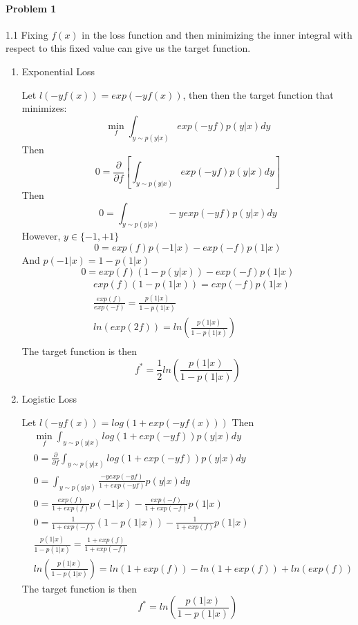 \documentclass[12pt]{report}
\begin{document}
\maketitle

\paragraph{Problem 1} 1.1
Fixing $f(x)$ in the loss function and then minimizing the inner integral with respect to this fixed value can give us the target function.
\begin{enumerate}
\item Exponential Loss
  
  Let $l(-yf(x)) = exp(-yf(x))$, then
  then the target function that minimizes:
  $$\min_{f}\int_{y \sim p(y | x)} exp(-yf) p(y|x)dy$$
  Then
  $$0 = \frac{\partial}{\partial f}\left[\int_{y \sim p(y|x)} exp(-yf)p(y|x)dy\right] $$
  Then
  $$0 = \int_{y \sim p(y|x)} -yexp(-yf)p(y|x)dy $$
  However, $y \in \{ -1, +1 \}$
  $$0 = exp(f)p(-1|x) - exp(-f)p(1|x) $$
  And $p(-1|x) = 1 - p(1|x)$
  $$0 = exp(f)(1-p(y|x)) - exp(-f)p(1|x) $$
  \begin{equation}
    \begin{aligned}
      & exp(f)(1-p(1|x)) = exp(-f)p(1|x)\\
      & \frac{exp(f)}{exp(-f)} = \frac{p(1|x)}{1-p(1|x)} \\
      & ln(exp(2f)) = ln\left(\frac{p(1|x)}{1 - p(1|x)}\right) \\
    \end{aligned}
  \end{equation}
  The target function is then
  $$ f^{*} = \frac{1}{2}ln\left(\frac{p(1|x)}{1-p(1|x)}\right) $$
  
\item Logistic Loss
  
  Let $l(-yf(x)) = log(1+ exp(-yf(x)))$
  Then
  \begin{equation}
    \begin{aligned}
      & \min_{f} \int_{y \sim p(y | x)} log(1 + exp(-yf))p(y|x)dy \\
      & 0 = \frac{\partial}{\partial f} \int_{y \sim p(y|x)} log(1 + exp(-yf))p(y|x)dy \\
      & 0 = \int_{y \sim p(y|x)} \frac{-y exp(-yf)}{1 + exp(-yf)} p(y|x)dy \\
      & 0 = \frac{exp(f)}{1 + exp(f)}p(-1|x)  - \frac{exp(-f)}{1 + exp(-f)}p(1|x) \\
      & 0 = \frac{1}{1+exp(-f)}(1 - p(1|x)) - \frac{1}{1+exp(f)}p(1|x) \\
      & \frac{p(1|x)}{1 - p(1|x)} = \frac{1+exp(f)}{1+exp(-f)} \\
      & ln\left(\frac{p(1|x)}{1 - p(1|x)}\right) = ln(1+exp(f)) - ln(1+exp(f)) + ln(exp(f))
    \end{aligned}
  \end{equation}
  The target function is then
  $$ f^{*} = ln\left(\frac{p(1|x)}{1 - p(1|x)}\right) $$


\end{enumerate}
\end{document}
